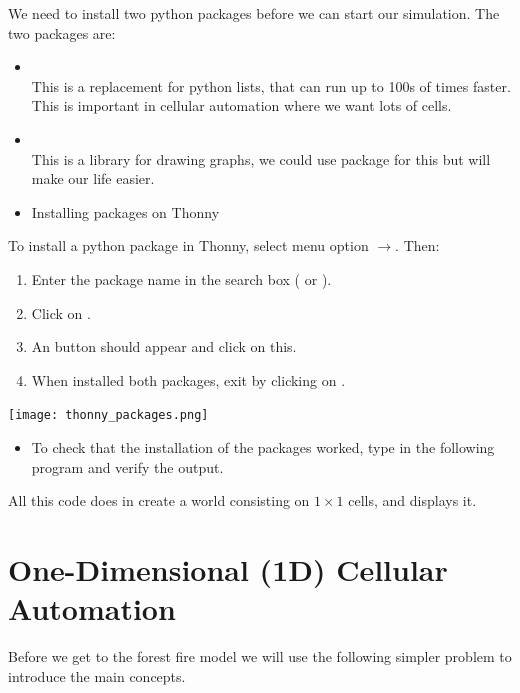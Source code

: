 \documentclass{coderdojo}
\newcommand\TODO[1]{
\begin{itemize}
\item[\todoSymbol] \color{todo} #1
\end{itemize}}
\begin{document}
We need to install two python packages before we can start our simulation. The two packages are:
\begin{itemize}
\item {}\\
This is a replacement for python lists, that can run up to 100s of times faster.  
This is important in cellular automation where we want lots of cells. 
\item {}\\
This is a library for drawing graphs, we could use  package for this but  will make our life easier.
\end{itemize}

\TODO{Installing packages on Thonny}{

To install a python package in Thonny, select menu option $\to$. Then:
\begin{enumerate}
\item Enter the package name in the search box ( or ).
\item Click on .
\item An  button should appear and click on this.
\item When installed both packages, exit by clicking on .
\end{enumerate} 

\centerline{\texttt{[image: thonny\_packages.png]}}}

\TODO{To check that the installation of the packages worked, type in the following program and verify the output.}
{All this code does in create a world consisting on $1\times 1$ cells, and displays it.  
}



\section{One-Dimensional (1D) Cellular Automation}

Before we get to the forest fire model we will use the following simpler problem to introduce the main concepts.
\end{document}
